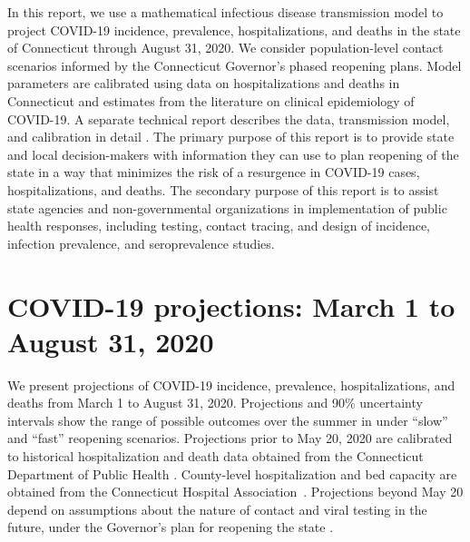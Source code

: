 \documentclass[11pt]{article}
\begin{document}

In this report, we use a mathematical infectious disease transmission model to project COVID-19 incidence, prevalence, hospitalizations, and deaths in the state of Connecticut through August 31, 2020.  We consider population-level contact scenarios informed by the Connecticut Governor's phased reopening plans.  Model parameters are calibrated using data on hospitalizations and deaths in Connecticut and estimates from the literature on clinical epidemiology of COVID-19.  A separate technical report describes the data, transmission model, and calibration in detail \citep{morozova2020tech}.  The primary purpose of this report is to provide state and local decision-makers with information they can use to plan reopening of the state in a way that minimizes the risk of a resurgence in COVID-19 cases, hospitalizations, and deaths.  The secondary purpose of this report is to assist state agencies and non-governmental organizations in implementation of public health responses, including testing, contact tracing, and design of incidence, infection prevalence, and seroprevalence studies. 



\section*{COVID-19 projections: March 1 to August 31, 2020}

We present projections of COVID-19 incidence, prevalence, hospitalizations, and deaths from March 1 to August 31, 2020.  Projections and 90\% uncertainty intervals show the range of possible outcomes over the summer in under ``slow'' and ``fast'' reopening scenarios.  Projections prior to May 20, 2020 are calibrated to historical hospitalization and death data obtained from the Connecticut Department of Public Health \citep{DPHwebsite}.  County-level hospitalization and bed capacity are obtained from the Connecticut Hospital Association~\citep{CHAwebsite}. 
Projections beyond May 20 depend on assumptions about the nature of contact and viral testing in the future, under the Governor's plan for reopening the state \citep{ct2020coronavirus}.  
\end{document}
